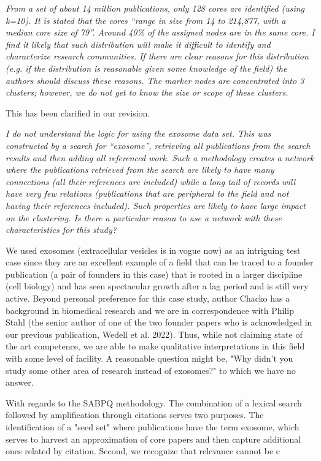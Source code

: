 \documentclass[11pt, oneside]{article}   	%
\begin{document}
 


\emph{From a set of about 14 million publications, only 128 cores are identified (using k=10). It is stated that the cores “range in size from 14 to 214,877, with a median core size of 79”. Around 40\% of the assigned nodes are in the same core. I find it likely that such distribution will make it difficult to identify and characterize research communities. If there are clear reasons for this distribution (e.g. if the distribution is reasonable given some knowledge of the field) the authors should discuss these reasons. The marker nodes are concentrated into 3 clusters; however, we do not get to know the size or scope of these clusters.}

This has been clarified in our revision. 

\emph{I do not understand the logic for using the exosome data set. This was constructed by a search for “exosome”, retrieving all publications from the search results and then adding all referenced work. Such a methodology creates a network where the publications retrieved from the search are likely to have many connections (all their references are included) while a long tail of records will have very few relations (publications that are peripheral to the field and not having their references included). Such properties are likely to have large impact on the clustering. Is there a particular reason to use a network with these characteristics for this study?}

We used exosomes (extracellular vesicles is in vogue now) as an intriguing  test case since they are an excellent example of a field that can be traced to a founder publication (a pair of founders in this case) that is rooted in a larger discipline (cell biology) and has seen spectacular growth after a lag period and is still very active. Beyond personal preference for this case study, author Chacko has a background in biomedical research and we are in correspondence with Philip Stahl (the senior author of one of the two founder papers who is acknowledged in our previous publication, Wedell et al. 2022). Thus, while not claiming state of the art competence, we are able to make qualitative interpretations in this field with some level of facility.  A reasonable question might be, "Why didn't you study some other area of research instead of exosomes?" to which we have no answer.

With regards to the SABPQ methodology. The combination of a lexical search followed by amplification through citations serves two purposes. The identification of a "seed set" where publications have the term exosome, which serves to harvest an approximation of core papers and then capture additional ones related by citation. Second, we recognize that relevance cannot  be c
\end{document}
